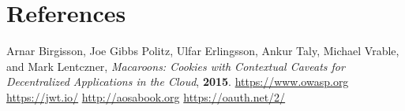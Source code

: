 \documentclass[9pt]{beamer}
\begin{document}
\section{References}
\begin{frame}
  
  \begin{thebibliography}{99}
   Arnar Birgisson, Joe Gibbs Politz, Ulfar Erlingsson, Ankur Taly, Michael Vrable, and Mark Lentczner,  \newblock \emph{Macaroons: Cookies with Contextual Caveats for Decentralized Applications in the Cloud}, \textbf{2015}.
   \href{https://www.owasp.org}{https://www.owasp.org}
   \href{https://jwt.io/}{https://jwt.io/}
   \href{http://aosabook.org}{http://aosabook.org}
   \href{https://oauth.net/2/}{https://oauth.net/2/}
  \end{thebibliography}
\end{frame}

\section{}
\begin{frame}{}
\end{frame}
\end{document}
